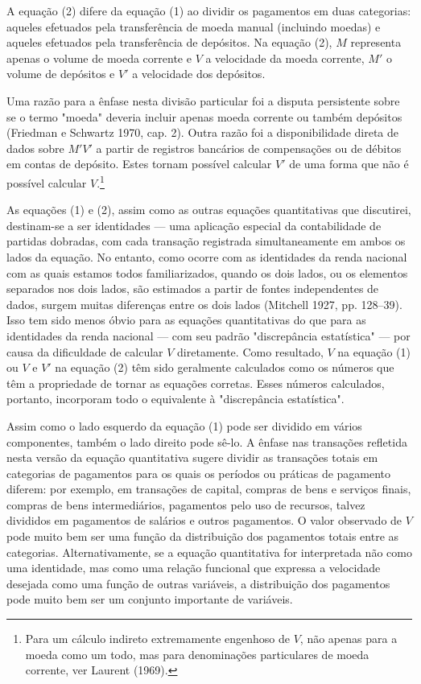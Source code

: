 \documentclass[12pt]{article}
\begin{document}
A equação (2) difere da equação (1) ao dividir os pagamentos em duas categorias: aqueles efetuados pela transferência de moeda manual (incluindo moedas) e aqueles efetuados pela transferência de depósitos. Na equação (2), $M$ representa apenas o volume de moeda corrente e $V$ a velocidade da moeda corrente, $M'$ o volume de depósitos e $V'$ a velocidade dos depósitos.

Uma razão para a ênfase nesta divisão particular foi a disputa persistente sobre se o termo "moeda" deveria incluir apenas moeda corrente ou também depósitos (Friedman e Schwartz 1970, cap. 2). Outra razão foi a disponibilidade direta de dados sobre $M'V'$ a partir de registros bancários de compensações ou de débitos em contas de depósito. Estes tornam possível calcular $V'$ de uma forma que não é possível calcular $V$.\footnote{Para um cálculo indireto extremamente engenhoso de $V$, não apenas para a moeda como um todo, mas para denominações particulares de moeda corrente, ver Laurent (1969).}

As equações (1) e (2), assim como as outras equações quantitativas que discutirei, destinam-se a ser identidades — uma aplicação especial da contabilidade de partidas dobradas, com cada transação registrada simultaneamente em ambos os lados da equação. No entanto, como ocorre com as identidades da renda nacional com as quais estamos todos familiarizados, quando os dois lados, ou os elementos separados nos dois lados, são estimados a partir de fontes independentes de dados, surgem muitas diferenças entre os dois lados (Mitchell 1927, pp. 128–39). Isso tem sido menos óbvio para as equações quantitativas do que para as identidades da renda nacional — com seu padrão "discrepância estatística" — por causa da dificuldade de calcular $V$ diretamente. Como resultado, $V$ na equação (1) ou $V$ e $V'$ na equação (2) têm sido geralmente calculados como os números que têm a propriedade de tornar as equações corretas. Esses números calculados, portanto, incorporam todo o equivalente à "discrepância estatística".

Assim como o lado esquerdo da equação (1) pode ser dividido em vários componentes, também o lado direito pode sê-lo. A ênfase nas transações refletida nesta versão da equação quantitativa sugere dividir as transações totais em categorias de pagamentos para os quais os períodos ou práticas de pagamento diferem: por exemplo, em transações de capital, compras de bens e serviços finais, compras de bens intermediários, pagamentos pelo uso de recursos, talvez divididos em pagamentos de salários e outros pagamentos. O valor observado de $V$ pode muito bem ser uma função da distribuição dos pagamentos totais entre as categorias. Alternativamente, se a equação quantitativa for interpretada não como uma identidade, mas como uma relação funcional que expressa a velocidade desejada como uma função de outras variáveis, a distribuição dos pagamentos pode muito bem ser um conjunto importante de variáveis.
\end{document}
